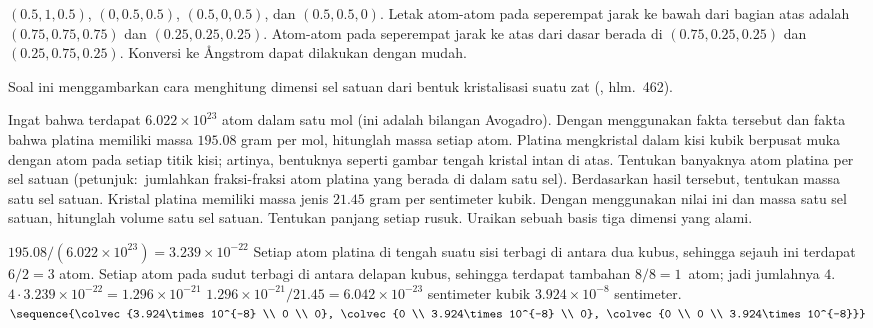 \begin{exercises}
\begin{answer}
      $(0.5,1,0.5)$, $(0,0.5,0.5)$, $(0.5,0,0.5)$, dan $(0.5,0.5,0)$.
      Letak atom-atom pada seperempat jarak ke bawah dari bagian atas
      adalah $(0.75,0.75,0.75)$ dan $(0.25,0.25,0.25)$. 
      Atom-atom pada seperempat jarak ke atas dari dasar
      berada di $(0.75,0.25,0.25)$ dan $(0.25,0.75,0.25)$. 
      Konversi ke \AA ngstrom dapat dilakukan dengan mudah.
    \end{answer}
  \item 
    Soal ini menggambarkan cara menghitung 
    dimensi sel satuan dari bentuk kristalisasi 
    suatu zat 
    (\cite{Ebbing}, hlm.~462).
    \begin{exparts}
      \partsitem Ingat bahwa terdapat $6.022\times 10^{23}$ atom dalam satu mol
        (ini adalah bilangan Avogadro).
        Dengan menggunakan fakta tersebut dan fakta bahwa platina memiliki
        massa $195.08$ gram per mol, hitunglah massa setiap atom.
      \partsitem Platina mengkristal dalam kisi kubik berpusat muka
        dengan atom pada setiap titik kisi;
        artinya, bentuknya seperti gambar tengah kristal intan di atas.
        Tentukan banyaknya atom platina per sel satuan
        (petunjuk:~jumlahkan fraksi-fraksi atom platina yang berada di dalam
        satu sel).
      \partsitem Berdasarkan hasil tersebut, tentukan massa satu sel satuan.
      \partsitem Kristal platina memiliki 
        massa jenis $21.45$ gram per sentimeter kubik.
        Dengan menggunakan nilai ini dan massa satu sel satuan, hitunglah
        volume satu sel satuan.
      \partsitem Tentukan panjang setiap rusuk.
      \partsitem Uraikan sebuah basis tiga dimensi yang alami.
    \end{exparts}
    \begin{answer}
      \begin{exparts}
        \partsitem $195.08/(6.022\times 10^{23})=3.239\times 10^{-22}$
        \partsitem Setiap atom platina di tengah suatu sisi terbagi di antara
          dua kubus, sehingga sejauh ini terdapat $6/2=3$ atom.
          Setiap atom pada sudut terbagi di antara delapan kubus, sehingga 
          terdapat tambahan $8/8=1$~atom; jadi jumlahnya $4$.
        \partsitem $4\cdot 3.239\times 10^{-22}=1.296\times 10^{-21}$
        \partsitem $1.296\times 10^{-21}/21.45=6.042\times 10^{-23}$
           sentimeter kubik
        \partsitem $3.924\times 10^{-8}$ sentimeter.
        \partsitem 
            $\sequence{\colvec{3.924\times 10^{-8} \\ 0 \\ 0},
                       \colvec{0 \\ 3.924\times 10^{-8} \\ 0},
                       \colvec{0 \\ 0 \\ 3.924\times 10^{-8}}}$
      \end{exparts}
    \end{answer}
\end{exercises}
\endinput
